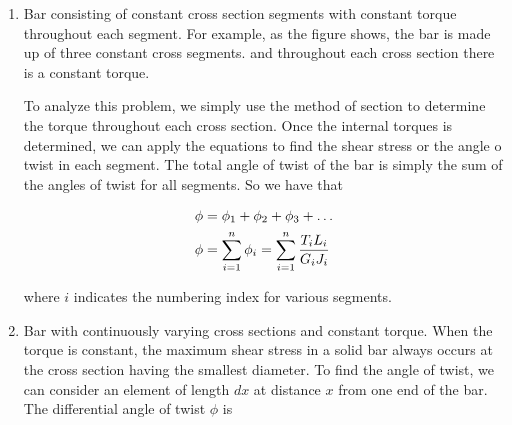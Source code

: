 \documentclass[
fontsize=10pt,
a4paper,
twosides=false,
open=any,
svgnames,
]{kaobook} %
\begin{document}
\begin{enumerate}
\item Bar consisting of constant cross section segments with constant torque throughout each segment. For example, as the figure shows, the bar is made up of three constant cross segments. and throughout each cross section there is a constant torque.
  
  To analyze this problem, we simply use the method of section to determine the torque throughout each cross section. Once the internal torques is determined, we can apply the equations to find the shear stress or the angle o twist in each segment. The total angle of twist of the bar is simply the sum of the angles of twist for all segments. So we have that

  \begin{figure}[h]
    \centering
  \end{figure}
  
  \begin{equation}
    \begin{gathered}
      \phi  = {\phi _1} + {\phi _2} + {\phi _3} +  \ldots  \hfill \\
      \phi  = \sum\limits_{i = 1}^n {{\phi _i} = \sum\limits_{i = 1}^n {\dfrac{{{T_i}{L_i}}}{{{G_i}{J_i}}}} }  \hfill \\ 
    \end{gathered}
  \end{equation}
  
  where $i$ indicates the numbering index for various segments.
  
\item Bar with continuously varying cross sections and constant torque. When the torque is constant, the maximum shear stress in a solid bar always occurs at the cross section having the smallest diameter. To find the angle of twist, we can consider an element of length $dx$ at distance $x$ from one end of the bar. The differential angle of twist $\phi$ is
  

\end{enumerate}
\end{document}
